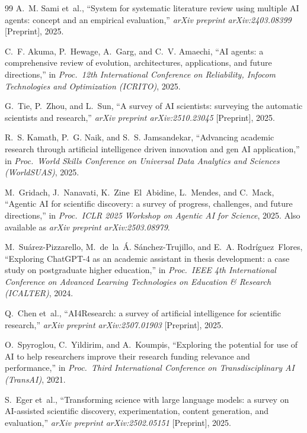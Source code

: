 \documentclass[sn-basic,Numbered]{sn-jnl}
\begin{document}
\begin{thebibliography}{99}
A.~M. Sami et~al.,
``System for systematic literature review using multiple AI agents:
concept and an empirical evaluation,''
\emph{arXiv preprint arXiv:2403.08399} [Preprint], 2025.

C.~F. Akuma, P.~Hewage, A.~Garg, and C.~V. Amaechi,
``AI agents: a comprehensive review of evolution, architectures,
applications, and future directions,''
in \emph{Proc.\ 12th International Conference on Reliability,
Infocom Technologies and Optimization (ICRITO)}, 2025.

G.~Tie, P.~Zhou, and L.~Sun,
``A survey of AI scientists: surveying the automatic scientists and
research,''
\emph{arXiv preprint arXiv:2510.23045} [Preprint], 2025.

R.~S. Kamath, P.~G. Naik, and S.~S. Jamsandekar,
``Advancing academic research through artificial intelligence driven
innovation and gen AI application,''
in \emph{Proc.\ World Skills Conference on Universal Data Analytics
and Sciences (WorldSUAS)}, 2025.

M.~Gridach, J.~Nanavati, K.~Zine~El~Abidine, L.~Mendes, and C.~Mack,
``Agentic AI for scientific discovery: a survey of progress,
challenges, and future directions,''
in \emph{Proc.\ ICLR 2025 Workshop on Agentic AI for Science},
2025. Also available as \emph{arXiv preprint arXiv:2503.08979}.

M.~Su\'arez-Pizzarello, M.~de~la~\'A. S\'anchez-Trujillo, and
E.~A. Rodr\'iguez~Flores,
``Exploring ChatGPT-4 as an academic assistant in thesis development:
a case study on postgraduate higher education,''
in \emph{Proc.\ IEEE 4th International Conference on Advanced
Learning Technologies on Education \& Research (ICALTER)}, 2024.

Q.~Chen et~al.,
``AI4Research: a survey of artificial intelligence for scientific
research,''
\emph{arXiv preprint arXiv:2507.01903} [Preprint], 2025.

O.~Spyroglou, C.~Yildirim, and A.~Koumpis,
``Exploring the potential for use of AI to help researchers improve
their research funding relevance and performance,''
in \emph{Proc.\ Third International Conference on Transdisciplinary
AI (TransAI)}, 2021.

S.~Eger et~al.,
``Transforming science with large language models: a survey on
AI-assisted scientific discovery, experimentation, content generation,
and evaluation,''
\emph{arXiv preprint arXiv:2502.05151} [Preprint], 2025.


\end{thebibliography}
\end{document}

